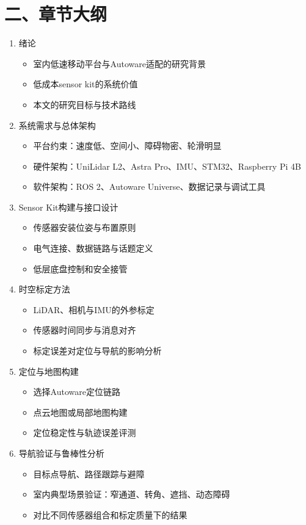 \documentclass[UTF8,a4paper,11pt]{ctexart}
\begin{document}
\section*{二、章节大纲}
\begin{enumerate}
  \item 绪论
  \begin{itemize}
    \item 室内低速移动平台与Autoware适配的研究背景
    \item 低成本sensor kit的系统价值
    \item 本文的研究目标与技术路线
  \end{itemize}

  \item 系统需求与总体架构
  \begin{itemize}
    \item 平台约束：速度低、空间小、障碍物密、轮滑明显
    \item 硬件架构：UniLidar L2、Astra Pro、IMU、STM32、Raspberry Pi 4B
    \item 软件架构：ROS 2、Autoware Universe、数据记录与调试工具
  \end{itemize}

  \item Sensor Kit构建与接口设计
  \begin{itemize}
    \item 传感器安装位姿与布置原则
    \item 电气连接、数据链路与话题定义
    \item 低层底盘控制和安全接管
  \end{itemize}

  \item 时空标定方法
  \begin{itemize}
    \item LiDAR、相机与IMU的外参标定
    \item 传感器时间同步与消息对齐
    \item 标定误差对定位与导航的影响分析
  \end{itemize}

  \item 定位与地图构建
  \begin{itemize}
    \item 选择Autoware定位链路
    \item 点云地图或局部地图构建
    \item 定位稳定性与轨迹误差评测
  \end{itemize}

  \item 导航验证与鲁棒性分析
  \begin{itemize}
    \item 目标点导航、路径跟踪与避障
    \item 室内典型场景验证：窄通道、转角、遮挡、动态障碍
    \item 对比不同传感器组合和标定质量下的结果
  \end{itemize}


\end{enumerate}
\end{document}
